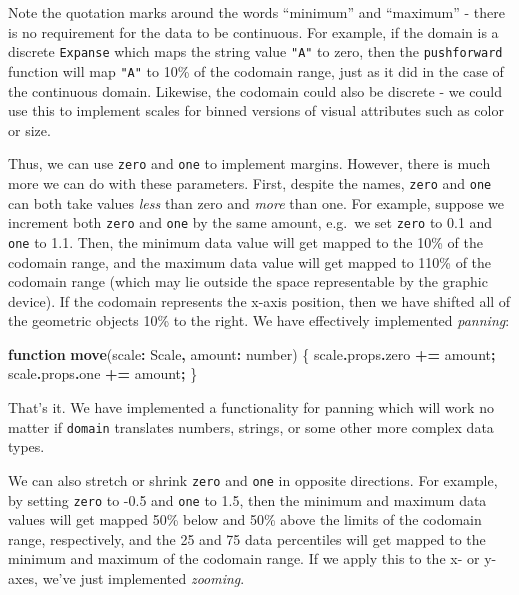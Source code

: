 \documentclass[
]{book}
\newenvironment{Shaded}{\begin{snugshade}}{\end{snugshade}}
\newcommand{\AttributeTok}[1]{\textcolor[rgb]{0.13,0.29,0.53}{#1}}
\newcommand{\DataTypeTok}[1]{\textcolor[rgb]{0.13,0.29,0.53}{#1}}
\newcommand{\FunctionTok}[1]{\textcolor[rgb]{0.13,0.29,0.53}{\textbf{#1}}}
\newcommand{\KeywordTok}[1]{\textcolor[rgb]{0.13,0.29,0.53}{\textbf{#1}}}
\newcommand{\NormalTok}[1]{#1}
\newcommand{\OperatorTok}[1]{\textcolor[rgb]{0.81,0.36,0.00}{\textbf{#1}}}
\theoremstyle{definition}
\theoremstyle{definition}
\theoremstyle{definition}
\theoremstyle{definition}
\theoremstyle{remark}
\begin{document}
Note the quotation marks around the words ``minimum'' and ``maximum'' - there is no requirement for the data to be continuous. For example, if the domain is a discrete \texttt{Expanse} which maps the string value \texttt{"A"} to zero, then the \texttt{pushforward} function will map \texttt{"A"} to 10\% of the codomain range, just as it did in the case of the continuous domain. Likewise, the codomain could also be discrete - we could use this to implement scales for binned versions of visual attributes such as color or size.

Thus, we can use \texttt{zero} and \texttt{one} to implement margins. However, there is much more we can do with these parameters. First, despite the names, \texttt{zero} and \texttt{one} can both take values \emph{less} than zero and \emph{more} than one. For example, suppose we increment both \texttt{zero} and \texttt{one} by the same amount, e.g.~we set \texttt{zero} to 0.1 and \texttt{one} to 1.1. Then, the minimum data value will get mapped to the 10\% of the codomain range, and the maximum data value will get mapped to 110\% of the codomain range (which may lie outside the space representable by the graphic device). If the codomain represents the x-axis position, then we have shifted all of the geometric objects 10\% to the right. We have effectively implemented \emph{panning}:

\begin{Shaded}
\begin{Highlighting}[]
\KeywordTok{function} \FunctionTok{move}\NormalTok{(scale}\OperatorTok{:}\NormalTok{ Scale}\OperatorTok{,}\NormalTok{ amount}\OperatorTok{:} \DataTypeTok{number}\NormalTok{) \{}
\NormalTok{  scale}\OperatorTok{.}\AttributeTok{props}\OperatorTok{.}\AttributeTok{zero} \OperatorTok{+=}\NormalTok{ amount}\OperatorTok{;}
\NormalTok{  scale}\OperatorTok{.}\AttributeTok{props}\OperatorTok{.}\AttributeTok{one} \OperatorTok{+=}\NormalTok{ amount}\OperatorTok{;}
\NormalTok{\}}
\end{Highlighting}
\end{Shaded}

That's it. We have implemented a functionality for panning which will work no matter if \texttt{domain} translates numbers, strings, or some other more complex data types.

We can also stretch or shrink \texttt{zero} and \texttt{one} in opposite directions. For example, by setting \texttt{zero} to -0.5 and \texttt{one} to 1.5, then the minimum and maximum data values will get mapped 50\% below and 50\% above the limits of the codomain range, respectively, and the 25 and 75 data percentiles will get mapped to the minimum and maximum of the codomain range. If we apply this to the x- or y-axes, we've just implemented \emph{zooming}.
\end{document}
